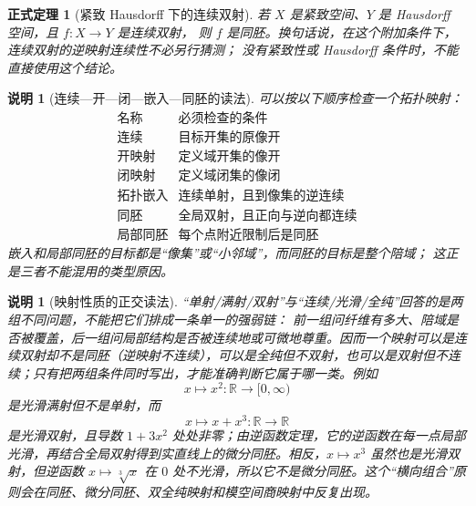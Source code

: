 \documentclass[UTF8,fontset=none,a4paper,11pt]{ctexart}
\theoremstyle{foundation-definition}
\theoremstyle{foundation-theorem}
\newtheorem{theorem}[definition]{正式定理}
\theoremstyle{foundation-proposition}
\theoremstyle{foundation-example}
\theoremstyle{foundation-remark}
\newtheorem{remark}[definition]{说明}
\theoremstyle{foundation-theorem}
\begin{document}
\begin{theorem}[紧致 Hausdorff 下的连续双射]\label{thm:compact-continuous-bijection}
若 \(X\) 是紧致空间、\(Y\) 是 Hausdorff 空间，且 \(f:X\to Y\) 是连续双射，
则 \(f\) 是同胚。换句话说，在这个附加条件下，连续双射的逆映射连续性不必另行猜测；
没有紧致性或 Hausdorff 条件时，不能直接使用这个结论。
\end{theorem}

\begin{remark}[连续—开—闭—嵌入—同胚的读法]
可以按以下顺序检查一个拓扑映射：
\[
\begin{array}{c|c}
\text{名称}&\text{必须检查的条件}\\
\hline
\text{连续}&\text{目标开集的原像开}\\
\text{开映射}&\text{定义域开集的像开}\\
\text{闭映射}&\text{定义域闭集的像闭}\\
\text{拓扑嵌入}&\text{连续单射，且到像集的逆连续}\\
\text{同胚}&\text{全局双射，且正向与逆向都连续}\\
\text{局部同胚}&\text{每个点附近限制后是同胚}
\end{array}
\]
嵌入和局部同胚的目标都是“像集”或“小邻域”，而同胚的目标是整个陪域；
这正是三者不能混用的类型原因。
\end{remark}

\begin{remark}[映射性质的正交读法]\label{rem:map-properties-orthogonal}
“单射/满射/双射”与“连续/光滑/全纯”回答的是两组不同问题，不能把它们排成一条单一的强弱链：
前一组问纤维有多大、陪域是否被覆盖，后一组问局部结构是否被连续地或可微地尊重。因而一个映射可以是连续双射却不是同胚（逆映射不连续），可以是全纯但不双射，也可以是双射但不连续；只有把两组条件同时写出，才能准确判断它属于哪一类。例如
\[
 x\longmapsto x^2:\mathbb R\to[0,\infty)
\]
是光滑满射但不是单射，而
\[
 x\longmapsto x+x^3:\mathbb R\to\mathbb R
\]
是光滑双射，且导数 \(1+3x^2\) 处处非零；由逆函数定理，它的逆函数在每一点局部光滑，再结合全局双射得到实直线上的微分同胚。相反，\(x\mapsto x^3\) 虽然也是光滑双射，但逆函数 \(x\mapsto\sqrt[3]{x}\) 在 \(0\) 处不光滑，所以它不是微分同胚。这个“横向组合”原则会在同胚、微分同胚、双全纯映射和模空间商映射中反复出现。
\end{remark}
\end{document}
